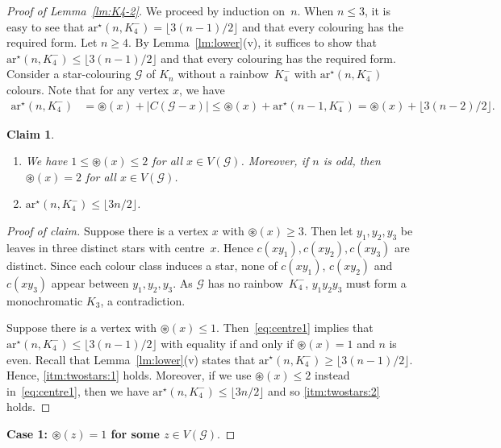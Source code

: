 \documentclass[a4paper, 12pt]{article}
\numberwithin{equation}{section}
\newtheorem{claim}[theorem]{Claim}
\newenvironment{proofclaim}[1][Proof of claim]{\begin{proof}[#1]\renewcommand*{\qedsymbol}{\(\blacksquare\)}}{\end{proof}}
\def\sar{{\mathrm{ar}^{\star}}}
\def\cen{\circledast}
\newcommand{\ms}[1]{\mathscr{#1}}
\begin{document}
\begin{proof}[Proof of Lemma~\ref{lm:K4-2}]
We proceed by induction on~$n$. 
When $n \le 3$, it is easy to see that $\sar(n, K_4^-) = \lfloor 3(n-1)/2 \rfloor$ and that every colouring has the required form.
Let $n \geq 4$. 
By Lemma~\ref{lm:lower}(v), it suffices to show that $\sar(n, K_4^-) \le \lfloor 3(n-1)/2 \rfloor$ and that every colouring has the required form.
Consider a star-colouring $\ms{G}$ of $K_n$ without a rainbow~$K_4^-$ with $\sar(n, K_4^-)$ colours. 
Note that for any vertex $x$, we have
\begin{align}
\label{eq:centre1}
\sar(n, K_4^-) &= \cen(x)+|C(\ms{G}-x)| 
	\le \cen(x)+\sar(n-1, K_4^-) 
	 = \cen(x)+\lfloor 3(n-2)/2 \rfloor.
\end{align}

\begin{claim} \label{clm:twostars1}
~
\begin{enumerate}[label={\rm (\roman*)}]
	\item We have $1 \le \cen(x) \leq 2$ for all $x \in V(\ms{G})$. 
Moreover, if $n$ is odd, then $\cen(x) = 2$ for all $x \in V(\ms{G})$. \label{itm:twostars:1}
	\item $\sar(n, K_4^-) \le \lfloor 3n/2 \rfloor$. \label{itm:twostars:2}
\end{enumerate}
\end{claim}

\begin{proofclaim}
 Suppose there is a vertex $x$ with $\cen(x) \ge 3$.
 Then let $y_1,y_2,y_3$ be leaves in three distinct stars with centre~$x$. 
Hence $c(xy_1), c(xy_2), c(xy_3)$ are distinct. 
Since each colour class induces a star, none of $c(xy_1)$, $c(xy_2)$ and $c(xy_3)$ appear between $y_1,y_2,y_3$. 
As $\ms{G}$ has no rainbow~$K_4^-$, $y_1y_2y_3$ must form a monochromatic $K_3$, a contradiction.

Suppose there is a vertex with $\cen(x) \leq 1$. 
Then~\eqref{eq:centre1} implies that $\sar(n,K_4^-) \leq \lfloor 3(n-1)/2\rfloor$ 
with equality if and only if $\cen(x)=1$ and $n$ is even.
Recall that Lemma~\ref{lm:lower}(v) states that $\sar(n, K_4^-) \ge \lfloor 3(n-1)/2 \rfloor$.
Hence, \ref{itm:twostars:1} holds. 
Moreover, if we use $\cen(x) \leq 2$ instead in~\eqref{eq:centre1}, then we have $\sar(n, K_4^-) \le \lfloor 3n/2 \rfloor$ and so \ref{itm:twostars:2} holds.
\end{proofclaim}


\medskip
\noindent
\textbf{Case 1: $\cen(z) = 1$ for some $z \in V(\ms{G})$}.


\end{proof}
\end{document}
